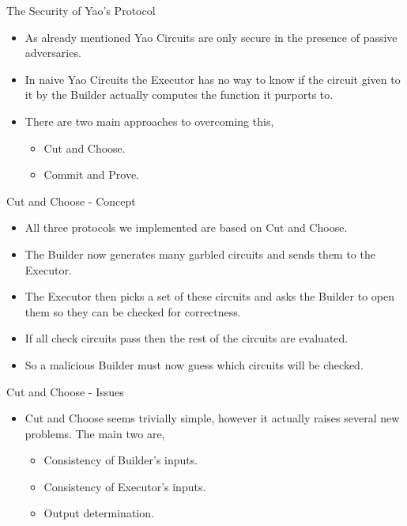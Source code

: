 \documentclass[t, 12pt]{beamer}            %
\begin{document}
\begin{frame}{The Security of Yao's Protocol}
	\begin{itemize}[<+->]
		\item As already mentioned Yao Circuits are only secure in the presence of passive adversaries. \footnotemark
		\item In naive Yao Circuits the Executor has no way to know if the circuit given to it by the Builder actually computes the function it purports to.
		\item There are two main approaches to overcoming this,
		\begin{itemize}
			\item Cut and Choose.
			\item Commit and Prove.
		\end{itemize}
	\end{itemize}
	
\end{frame}


\begin{frame}{Cut and Choose - Concept}
	\begin{itemize}[<+->]
		\item All three protocols we implemented are based on Cut and Choose.
		\item The Builder now generates many garbled circuits and sends them to the Executor.
		\item The Executor then picks a set of these circuits and asks the Builder to open them so they can be checked for correctness.
		\item If all check circuits pass then the rest of the circuits are evaluated.
		\item So a malicious Builder must now guess which circuits will be checked.
	\end{itemize}

\end{frame}


\begin{frame}{Cut and Choose - Issues}
	\begin{itemize}[<+->]
		\item Cut and Choose seems trivially simple, however it actually raises several new problems. The main two are,
		\begin{itemize}
			\item Consistency of Builder's inputs.
			\item Consistency of Executor's inputs.
			\item Output determination.
		\end{itemize}
	\end{itemize}

\end{frame}
\end{document}
